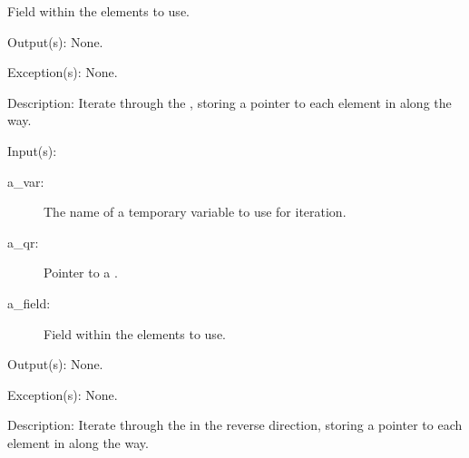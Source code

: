 \begin{capi}
\begin{capilist}
\begin{description}
			Field within the  elements to use.
		\end{description}
	\item[Output(s): ] None.
	\item[Exception(s): ] None.
	\item[Description: ]
		Iterate through the , storing a pointer to each
		element in  along the way.
	\end{capilist}
\label{qr_reverse_foreach}
	\begin{capilist}
	\item[Input(s): ]
		\begin{description}\item[]
		\item[a\_var: ]
			The name of a temporary variable to use for iteration.
		\item[a\_qr: ]
			Pointer to a .
		\item[a\_field: ]
			Field within the  elements to use.
		\end{description}
	\item[Output(s): ] None.
	\item[Exception(s): ] None.
	\item[Description: ]
		Iterate through the  in the reverse direction,
		storing a pointer to each element in  along the
		way.
	\end{capilist}
\end{capi}
